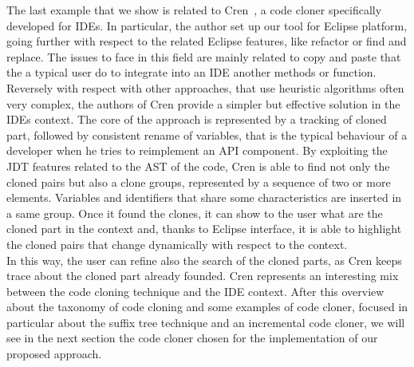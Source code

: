 The last example that we show is related to Cren~\cite{jablonski_cren:_2007}, a code cloner specifically developed for IDEs. In particular, the author set up our tool for Eclipse platform, going further with respect to the related Eclipse features, like refactor or  find and replace. The issues to face in this field are mainly related to copy and paste that the a typical user do to integrate into an IDE another methods or function. Reversely with respect with other approaches, that use heuristic algorithms often very complex, the authors of Cren provide a simpler but  effective solution in the IDEs context. 
The core of the approach is represented by a tracking of cloned part, followed by consistent rename of variables, that is the typical behaviour of a developer when he tries to reimplement an API component. By exploiting the JDT features related to the AST of the code, Cren is able to find not only the cloned pairs but also a clone groups, represented by a sequence of two or more elements. Variables and identifiers that share some characteristics are inserted in a same group. Once it found the clones, it can show to the user what are the cloned part in the context and, thanks to Eclipse interface, it is able to highlight the cloned pairs that change dynamically with respect to the context. \\
In this way, the user can refine also the search of the cloned parts, as Cren keeps trace about the cloned part already founded. Cren represents an interesting mix between the code cloning technique and the IDE context. After this overview about the taxonomy of code cloning and some examples of code cloner, focused in particular about the suffix tree technique and an incremental code cloner, we will see in the next section the code cloner chosen for the implementation of our proposed approach. 
\newpage
